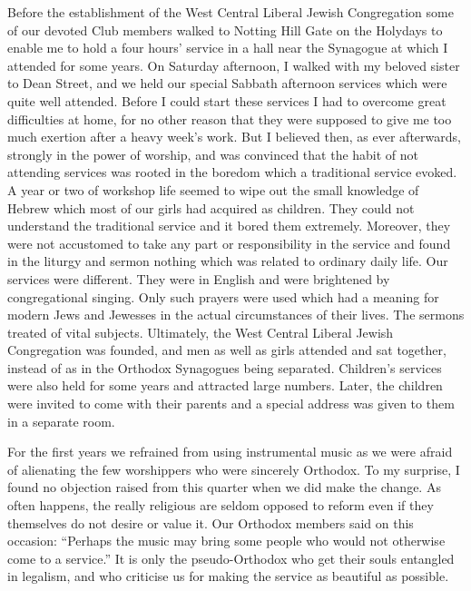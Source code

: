 Before the establishment of the West Central Liberal
Jewish Congregation some of our devoted Club members
walked to Notting Hill Gate on the Holydays to enable
me to hold a four hours’ service in a hall near the Synagogue
at which I attended for some years. On Saturday
afternoon, I walked with my beloved sister to Dean
Street, and we held our special Sabbath afternoon services
which were quite well attended. Before I could start
these services I had to overcome great difficulties at home,
for no other reason that they were supposed to give me too
much exertion after a heavy week’s work. But I believed
then, as ever afterwards, strongly in the power of worship,
and was convinced that the habit of not attending services
was rooted in the boredom which a traditional service
evoked. A year or two of workshop life seemed to wipe
out the small knowledge of Hebrew which most of our
girls had acquired as children. They could not understand
the traditional service and it bored them extremely.
Moreover, they were not accustomed to take any part or
responsibility in the service and found in the liturgy and
sermon nothing which was related to ordinary daily life.
Our services were different. They were in English and
were brightened by congregational singing. Only such
prayers were used which had a meaning for modern
Jews and Jewesses in the actual circumstances of their
lives. The sermons treated of vital subjects. Ultimately,
the West Central Liberal Jewish Congregation was
founded, and men as well as girls attended and sat together,
instead of as in the Orthodox Synagogues being
separated. Children’s services were also held for some
years and attracted large numbers. Later, the children
were invited to come with their parents and a special
address was given to them in a separate room.

For the first years we refrained from using instrumental
music as we were afraid of alienating the few worshippers
who were sincerely Orthodox. To my surprise, I found
no objection raised from this quarter when we did make
the change. As often happens, the really religious are
seldom opposed to reform even if they themselves do not
desire or value it. Our Orthodox members said on this
occasion: “Perhaps the music may bring some people
who would not otherwise come to a service.” It is only
the pseudo-Orthodox who get their souls entangled in
legalism, and who criticise us for making the service as
beautiful as possible.


